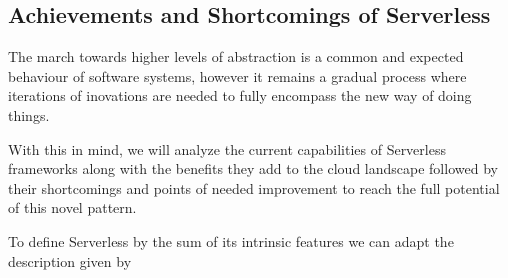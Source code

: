 \subsection{Achievements and Shortcomings of Serverless}
The march towards higher levels of abstraction is a common and expected behaviour of software systems, however it remains a gradual process where iterations of inovations are needed to fully encompass the new way of doing things.\par

With this in mind, we will analyze the current capabilities of Serverless frameworks along with the benefits they add to the cloud landscape followed by their shortcomings and points of needed improvement to reach the full potential of this novel pattern.\par

To define Serverless by the sum of its intrinsic features we can adapt the description given by \citet{10.1145/3508360}

